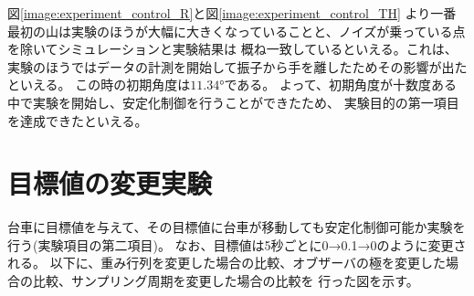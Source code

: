 	図\ref{image:experiment_control_R}と図\ref{image:experiment_control_TH}
	より一番最初の山は実験のほうが大幅に大きくなっていることと、ノイズが乗っている点を除いてシミュレーションと実験結果は
	概ね一致しているといえる。これは、実験のほうではデータの計測を開始して振子から手を離したためその影響が出たといえる。
	この時の初期角度は$11.34°$である。
	よって、初期角度が十数度ある中で実験を開始し、安定化制御を行うことができたため、
	実験目的の第一項目を達成できたといえる。
	
	
	
\newpage
\section{目標値の変更実験}
	台車に目標値を与えて、その目標値に台車が移動しても安定化制御可能か実験を行う(実験項目の第二項目)。
	なお、目標値は5秒ごとに0→0.1→0のように変更される。
	以下に、重み行列を変更した場合の比較、オブザーバの極を変更した場合の比較、サンプリング周期を変更した場合の比較を
	行った図を示す。
	\par
